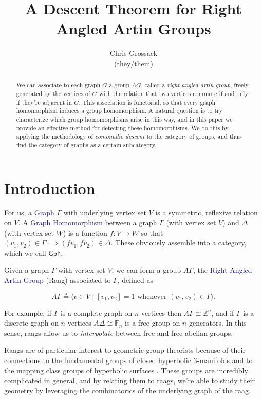 \documentclass[12pt]{article}
\author{Chris Grossack\\ (they/them)}
\title{A Descent Theorem for Right Angled Artin Groups}
\theoremstyle{definition}
\theoremstyle{theorem}
\newcommand{\teq}{\triangleq}
\newcommand*{\important}[1]{\textcolor{MidnightBlue}{#1}}
\begin{document}
\maketitle

\begin{abstract}
  We can associate to each graph $G$ a group $AG$, called a
  \emph{right angled artin group}, freely generated by the vertices
  of $G$ with the relation that two vertices commute if and only if 
  they're adjacent in $G$. This association is functorial, so that 
  every graph homomorphism induces a group homomorphism. 
  A natural question is to try characterize which group homomorphisms
  arise in this way, and in this paper we provide an effective 
  method for detecting these homomorphisms. We do this by applying the
  methodology of \emph{comonadic descent} to the category of groups,
  and thus find the category of graphs as a certain subcategory.
\end{abstract}

\section{Introduction}
\label{intro}

  For us, a \important{Graph} $\Gamma$ with underlying vertex set $V$ is a 
  symmetric, reflexive relation on $V$. A \important{Graph Homomorphism} between 
  a graph $\Gamma$ (with vertex set $V$) and $\Delta$ (with vertex set $W$) is a 
  function $f : V \to W$ so that $(v_1, v_2) \in \Gamma \implies (f v_1, f v_2) \in \Delta$.
  These obviously assemble into a category, which we call $\mathsf{Gph}$.

  Given a graph $\Gamma$ with vertex set $V$, we can form a group $A\Gamma$, the 
  \important{Right Angled Artin Group} (Raag) associated to $\Gamma$, defined as

  \[ A\Gamma \teq \langle v \in V \mid [v_1, v_2] = 1 \text{ whenever } (v_1,v_2) \in \Gamma \rangle .\]

  For example, if $\Gamma$ is a complete graph on $n$ vertices then 
  $A\Gamma \cong \mathbb{Z}^n$, and if $\Gamma$ is a discrete graph on $n$ vertices
  $A\Delta \cong \mathbb{F}_n$ is a free group on $n$ generators. 
  In this sense, raags allow us to \emph{interpolate} between free and free
  abelian groups.

  Raags are of particular interest to geometric group theorists because
  of their connections to the fundamental groups of closed hyperbolic
  $3$-manifolds \cite{servatiusSURFACESUBGROUPSGRAPH}
  and to the mapping class groups of hyperbolic surfaces 
  \cite{kimGeometryCurveGraph2014}.
  These groups are incredibly complicated in general, and by relating
  them to raags, we're able to study their geometry by leveraging
  the combinatorics of the underlying graph of the raag.
\end{document}

